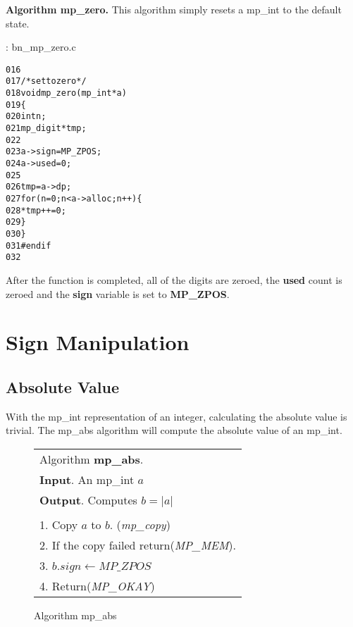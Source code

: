 \documentclass[b5paper]{book}
\begin{document}
\textbf{Algorithm mp\_zero.}
This algorithm simply resets a mp\_int to the default state.  

\vspace{+3mm}\begin{small}
\hspace{-5.1mm}{\bf File}: bn\_mp\_zero.c
\vspace{-3mm}
\begin{alltt}
016   
017   /* set to zero */
018   void mp_zero (mp_int * a)
019   \{
020     int       n;
021     mp_digit *tmp;
022   
023     a->sign = MP_ZPOS;
024     a->used = 0;
025   
026     tmp = a->dp;
027     for (n = 0; n < a->alloc; n++) \{
028        *tmp++ = 0;
029     \}
030   \}
031   #endif
032   
\end{alltt}
\end{small}

After the function is completed, all of the digits are zeroed, the \textbf{used} count is zeroed and the 
\textbf{sign} variable is set to \textbf{MP\_ZPOS}.

\section{Sign Manipulation}
\subsection{Absolute Value}
With the mp\_int representation of an integer, calculating the absolute value is trivial.  The mp\_abs algorithm will compute
the absolute value of an mp\_int.

\begin{figure}[here]
\begin{center}
\begin{tabular}{l}
\hline Algorithm \textbf{mp\_abs}. \\
\textbf{Input}.   An mp\_int $a$ \\
\textbf{Output}.  Computes $b = \vert a \vert$ \\
\hline \\
1.  Copy $a$ to $b$.  (\textit{mp\_copy}) \\
2.  If the copy failed return(\textit{MP\_MEM}). \\
3.  $b.sign \leftarrow MP\_ZPOS$ \\
4.  Return(\textit{MP\_OKAY}) \\
\hline
\end{tabular}
\end{center}
\caption{Algorithm mp\_abs}
\end{figure}
\end{document}
